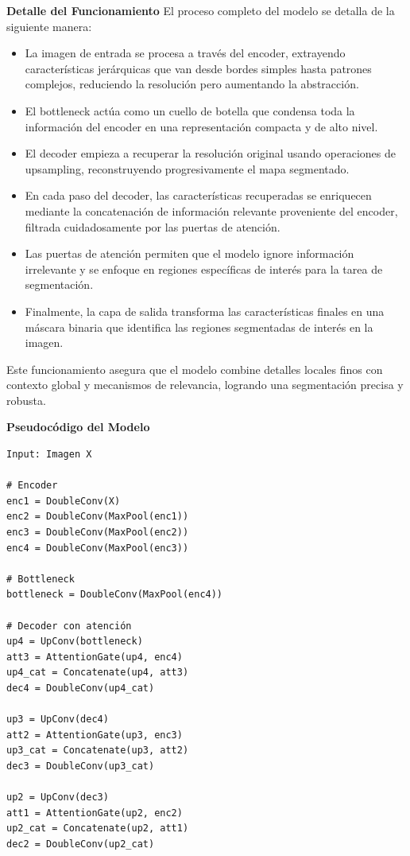 \begin{enumerate}
\begin{itemize}
\textbf{Detalle del Funcionamiento}
El proceso completo del modelo se detalla de la siguiente manera:
\begin{itemize}
\item La imagen de entrada se procesa a través del encoder, extrayendo características jerárquicas que van desde bordes simples hasta patrones complejos, reduciendo la resolución pero aumentando la abstracción.
\item El bottleneck actúa como un cuello de botella que condensa toda la información del encoder en una representación compacta y de alto nivel.
\item El decoder empieza a recuperar la resolución original usando operaciones de upsampling, reconstruyendo progresivamente el mapa segmentado.
\item En cada paso del decoder, las características recuperadas se enriquecen mediante la concatenación de información relevante proveniente del encoder, filtrada cuidadosamente por las puertas de atención.
\item Las puertas de atención permiten que el modelo ignore información irrelevante y se enfoque en regiones específicas de interés para la tarea de segmentación.
\item Finalmente, la capa de salida transforma las características finales en una máscara binaria que identifica las regiones segmentadas de interés en la imagen.
\end{itemize}

Este funcionamiento asegura que el modelo combine detalles locales finos con contexto global y mecanismos de relevancia, logrando una segmentación precisa y robusta.

\textbf{Pseudocódigo del Modelo}
\begin{verbatim}
Input: Imagen X

# Encoder
enc1 = DoubleConv(X)
enc2 = DoubleConv(MaxPool(enc1))
enc3 = DoubleConv(MaxPool(enc2))
enc4 = DoubleConv(MaxPool(enc3))

# Bottleneck
bottleneck = DoubleConv(MaxPool(enc4))

# Decoder con atención
up4 = UpConv(bottleneck)
att3 = AttentionGate(up4, enc4)
up4_cat = Concatenate(up4, att3)
dec4 = DoubleConv(up4_cat)

up3 = UpConv(dec4)
att2 = AttentionGate(up3, enc3)
up3_cat = Concatenate(up3, att2)
dec3 = DoubleConv(up3_cat)

up2 = UpConv(dec3)
att1 = AttentionGate(up2, enc2)
up2_cat = Concatenate(up2, att1)
dec2 = DoubleConv(up2_cat)


\end{verbatim}
\end{itemize}
\end{enumerate}
